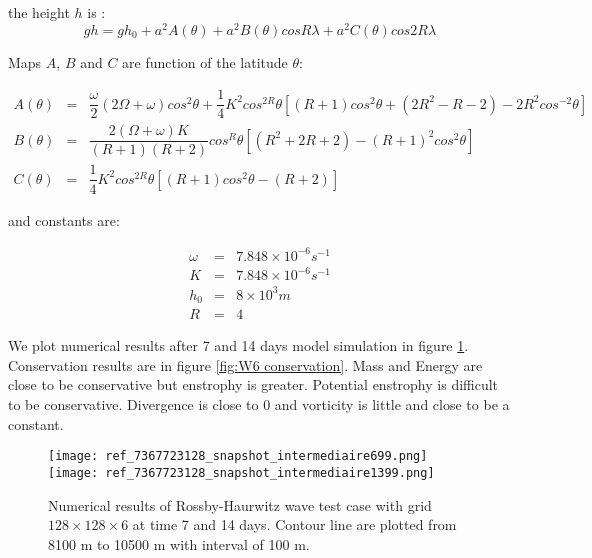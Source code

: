 the height $h$ is :
\begin{equation}
gh = gh_0 + a^2 A(\theta) + a^2 B(\theta) cos R \lambda + a^2 C(\theta) cos 2 R \lambda 
\label{eq:W6 height}
\end{equation}

Maps $A$, $B$ and $C$ are function of the latitude $\theta$:

\begin{equation}
\begin{array}{rcl}
A(\theta) & = & \dfrac{\omega}{2} \left( 2 \Omega + \omega \right) cos^2 \theta + \dfrac{1}{4} K^2 cos^{2R} \theta \left[ (R+1) cos^2 \theta+ (2R^2 -R -2) - 2R^2 cos^{-2} \theta \right]\\
B(\theta) & = & \dfrac{2 (\Omega +\omega) K }{(R+1)(R+2)} cos^R \theta \left[ (R^2 + 2R +2) - (R+1)^2 cos^2 \theta  \right] \\
C(\theta) & = & \dfrac{1}{4} K^2 cos^{2R} \theta \left[ (R+1) cos^2 \theta - (R+2) \right]
\end{array}
\end{equation}

and constants are:

\begin{equation}
\begin{array}{rcl}
\omega & = & 7.848 \times 10^{-6} s^{-1}\\
K & = & 7.848 \times 10^{-6} s^{-1}\\
h_0 & = & 8 \times 10^3 m \\
R & = & 4
\end{array}
\end{equation} 

We plot numerical results after 7 and 14 days model simulation in figure \ref{fig:W6 snapshot}. Conservation results are in figure \ref{fig:W6 conservation}. Mass and Energy are close to be conservative but enstrophy is greater. Potential enstrophy is difficult to be conservative. Divergence is close to $0$ and vorticity is little and close to be a constant. 

\begin{figure}[ht!]
\texttt{[image: ref\_7367723128\_snapshot\_intermediaire699.png]}
\texttt{[image: ref\_7367723128\_snapshot\_intermediaire1399.png]}\\
\caption{Numerical results of Rossby-Haurwitz wave test case with grid  $128 \times 128 \times 6$ at time 7 and 14 days. Contour line are plotted from 8100 m to 10500 m with interval of 100 m.}
\label{fig:W6 snapshot}
\end{figure}

